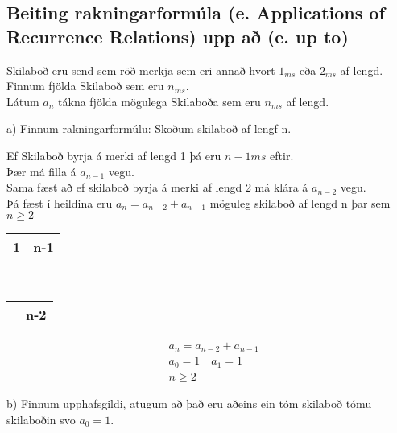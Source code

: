 \newpage
\setcounter{section}{8}
\setcounter{subsection}{0}
\subsection{Beiting rakningarformúla  (e. Applications of Recurrence Relations) upp að (e. up to)}
Skilaboð eru send sem röð merkja sem eri annað hvort $1_{ms}$ eða $2_{ms}$ af lengd.\vspace*{0.5em}\\
Finnum fjölda Skilaboð sem eru $n_{ms}$.\\
Látum $a_n$ tákna fjölda mögulega Skilaboða sem eru $n_{ms}$ af lengd.\vspace*{0.5em}

a) Finnum rakningarformúlu:
\hspace*{-1.3em}Skoðum skilaboð af lengf n.\\
\begin{multicols}{2}
    \hspace*{-1.3em}Ef Skilaboð byrja á merki af lengd 1 þá eru $n - 1 ms$ eftir.\\
    Þær má filla á $a_{n-1}$ vegu.\\
    Sama fæst að ef skilaboð byrja á merki af lengd 2 má klára á $a_{n-2}$ vegu.\\
    Þá fæst í heildina eru $a_n = a_{n-2}+ a_{n-1}$ möguleg skilaboð af lengd n þar sem $n \geq 2$
    \columnbreak

    \hspace*{3em}\begin{tabular}{ |c|c| }
        \hline
        1 & \qquad n-1 \hspace*{3em}
        \\\hline
    \end{tabular}\vspace*{1em}\\ 
    \hspace*{4.3em}\begin{tabular}{ |c|c| }
        \hline
        \quad2  \quad & \qquad n-2 \hspace*{3em}
        \\\hline
    \end{tabular}
    \begin{align*}
        &a_n = a_{n-2}+ a_{n-1}\\
        &a_0=1 \quad a_1=1\\
        &n \geq 2
    \end{align*}
\end{multicols}
b) Finnum upphafsgildi, atugum að það eru aðeins ein tóm skilaboð tómu \hspace*{2.7em}skilaboðin svo $a_0=1$.

